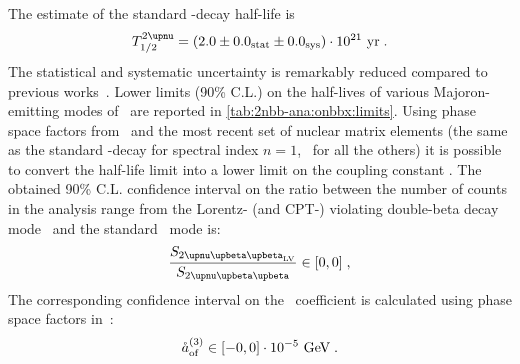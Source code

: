 The estimate of the standard \nnbb-decay half-life is
\[
  \thalftwoM = (2.0 \pm \stat{0.0} \pm \syst{0.0}) \cdot 10^{21}~\text{yr} \;.
\]
The statistical and systematic uncertainty is remarkably reduced compared to previous
works~\cite{Agostini2015a}.
\newpar
Lower limits (90\% C.L.) on the half-lives of various Majoron-emitting modes of \onbb\ are
reported in \cref{tab:2nbb-ana:onbbx:limits}. Using phase space factors
from~\cite{Kotila2015} and the most recent set of nuclear matrix elements (the same as the
standard \onbb-decay for spectral index $n=1$,~\cite{Hirsch1995} for all the others) it is
possible to convert the half-life limit into a lower limit on the coupling constant \ga.
\newpar
The obtained 90\% C.L. confidence interval on the ratio between the number of counts in
the analysis range from the Lorentz- (and CPT-) violating double-beta decay mode \nnbblv\
and the standard \nnbb\ mode is:
\[
  \frac{S_\nnbblvM}{S_\nnbbM} \in [0,0] \;,
\]
The corresponding confidence interval on the \aof\ coefficient is calculated using phase
space factors in~\cite{Nitescu2020}:
\[
  {\mathring{a}_\text{of}^{(3)}} \in [-0, 0] \cdot 10^{-5}~\text{GeV} \;.
\]


\begin{table}
  \centering
  \caption{%
    90\% C.L.~lower limits for Majoron-emitting \onbb\ modes contributing to the \nnbb\
    event distribution. Nuclear matrix elements for spectral index $n=1$ are the same as
    the standard \onbb, and have been therefore selected from the most recent nuclear
    calculations.  Matrix elements for the other decay modes have been taken
    from~\cite{Hirsch1995}.  Phase space factors have been taken from~\cite{Kotila2015}.
    \fillme{numbers}
  }\label{tab:2nbb-ana:onbbx:limits}
  
\end{table}

